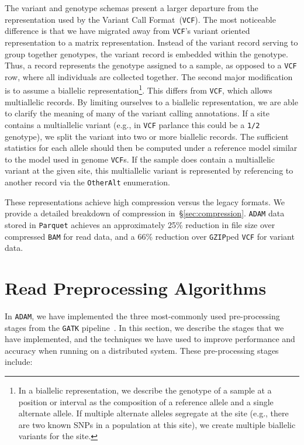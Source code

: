 \documentclass[masters]{ucbthesis}
\begin{document}
The variant and genotype schemas present a larger departure from the representation used by the Variant Call
Format~(\texttt{VCF}). The most noticeable difference is that we have migrated away from \texttt{VCF}'s variant oriented
representation to a matrix representation. Instead of the variant record serving to group together genotypes, the
variant record is embedded within the genotype. Thus, a record represents the genotype assigned to a sample,
as opposed to a \texttt{VCF} row, where all individuals are collected together. The second major modification is to assume
a biallelic representation\footnote{In a biallelic representation, we describe the genotype of a sample at a position or
interval as the composition of a reference allele and a single alternate allele. If multiple alternate alleles segregate at
the site (e.g., there are two known SNPs in a population at this site), we create multiple biallelic variants for the site.}.
This differs from \texttt{VCF}, which allows multiallelic records. By limiting
ourselves to a biallelic representation, we are able to clarify the meaning of many of the variant calling annotations. If a
site contains a multiallelic variant (e.g., in \texttt{VCF} parlance this could be a \texttt{1/2} genotype), we split the
variant into two or more biallelic records. The sufficient statistics for each allele should then be computed under
a reference model similar to the model used in genome \texttt{VCF}s. If the sample does contain a multiallelic variant at
the given site, this multiallelic variant is represented by referencing to another record via the \texttt{OtherAlt}
enumeration.

These representations achieve high compression versus the legacy formats. We provide a detailed breakdown of
compression in~\S\ref{sec:compression}. \texttt{ADAM} data stored in \texttt{Parquet} achieves an
approximately 25\% reduction in file size over compressed \texttt{BAM} for read data, and a 66\% reduction
over \texttt{GZIP}ped \texttt{VCF} for variant data.

\section{Read Preprocessing Algorithms}
\label{sec:read-preprocessing}

In \texttt{ADAM}, we have implemented the three most-commonly used pre-processing stages from the
\texttt{GATK} pipeline~\cite{depristo11}. In this section, we describe the stages that we have
implemented, and the techniques we have used to improve performance and accuracy when running on
a distributed system. These pre-processing stages include:
\end{document}
